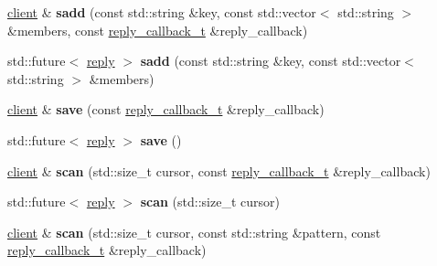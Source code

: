 \begin{DoxyCompactItemize}
\mbox{\label{classcpp__redis_1_1client_acf725ad7bc758599617ff166280f9622}} 
\mbox{\hyperlink{classcpp__redis_1_1client}{client}} \& {\bfseries sadd} (const std\+::string \&key, const std\+::vector$<$ std\+::string $>$ \&members, const \mbox{\hyperlink{classcpp__redis_1_1client_af7a65eb21aa25230bfbb0b0203c4fc04}{reply\+\_\+callback\+\_\+t}} \&reply\+\_\+callback)
\item 
\mbox{\label{classcpp__redis_1_1client_a1a611fd2c5847d37973fed5d24f25fa1}} 
std\+::future$<$ \mbox{\hyperlink{classcpp__redis_1_1reply}{reply}} $>$ {\bfseries sadd} (const std\+::string \&key, const std\+::vector$<$ std\+::string $>$ \&members)
\item 
\mbox{\label{classcpp__redis_1_1client_a01987f9fb419cfbce81872be8cd17619}} 
\mbox{\hyperlink{classcpp__redis_1_1client}{client}} \& {\bfseries save} (const \mbox{\hyperlink{classcpp__redis_1_1client_af7a65eb21aa25230bfbb0b0203c4fc04}{reply\+\_\+callback\+\_\+t}} \&reply\+\_\+callback)
\item 
\mbox{\label{classcpp__redis_1_1client_a40f28e53d89e46aff3df4670736b1034}} 
std\+::future$<$ \mbox{\hyperlink{classcpp__redis_1_1reply}{reply}} $>$ {\bfseries save} ()
\item 
\mbox{\label{classcpp__redis_1_1client_ad4f6d98940e778ca95c802b210bd97e8}} 
\mbox{\hyperlink{classcpp__redis_1_1client}{client}} \& {\bfseries scan} (std\+::size\+\_\+t cursor, const \mbox{\hyperlink{classcpp__redis_1_1client_af7a65eb21aa25230bfbb0b0203c4fc04}{reply\+\_\+callback\+\_\+t}} \&reply\+\_\+callback)
\item 
\mbox{\label{classcpp__redis_1_1client_a8196376dec0062d42f1199e7cec537d4}} 
std\+::future$<$ \mbox{\hyperlink{classcpp__redis_1_1reply}{reply}} $>$ {\bfseries scan} (std\+::size\+\_\+t cursor)
\item 
\mbox{\label{classcpp__redis_1_1client_ad663206aa569070b3f3f269ea43daff5}} 
\mbox{\hyperlink{classcpp__redis_1_1client}{client}} \& {\bfseries scan} (std\+::size\+\_\+t cursor, const std\+::string \&pattern, const \mbox{\hyperlink{classcpp__redis_1_1client_af7a65eb21aa25230bfbb0b0203c4fc04}{reply\+\_\+callback\+\_\+t}} \&reply\+\_\+callback)

\end{DoxyCompactItemize}
